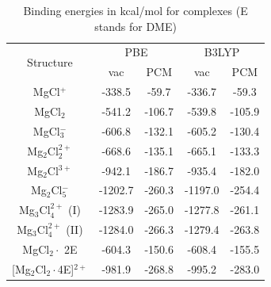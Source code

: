 \begin{table}
    \centering
    \caption[Binding energies in kcal/mol for complexes]{Binding energies in kcal/mol for complexes (E stands for DME)}
    \label{tab:mg-cl-dme-binding-energies}
\begin{tabular}{ccccc}
\toprule
\multicolumn{1}{c}{\multirow{2}{*}{Structure}} & \multicolumn{2}{c}{PBE}                                 & \multicolumn{2}{c}{B3LYP}                               \\
\multicolumn{1}{c}{}                           & \multicolumn{1}{c}{vac}    & \multicolumn{1}{c}{PCM}    & \multicolumn{1}{c}{vac}    & \multicolumn{1}{c}{PCM}    \\
\midrule
MgCl$^{+}$                                          & -338.5                     & -59.7                      & -336.7                     & -59.3                      \\
MgCl$_2$                                          & -541.2                     & -106.7                     & -539.8                     & -105.9                     \\
MgCl$_3^{-}$                                         & -606.8                     & -132.1                     & -605.2                     & -130.4                     \\
Mg$_2$Cl$_2^{2+}$                   & -668.6 & -135.1 & -665.1 & -133.3 \\
Mg$_2$Cl$^{3+}$                    & -942.1 & -186.7 & -935.4 & -182.0 \\
Mg$_2$Cl$_5^{-}$                                       & -1202.7                    & -260.3                     & -1197.0                    & -254.4                     \\
Mg$_3$Cl$_4^{2+}$ (I)                                   & -1283.9                    & -265.0                     & -1277.8                    & -261.1                     \\
Mg$_3$Cl$_4^{2+}$ (II)                                  & -1284.0                    & -266.3                     & -1279.4                    & -263.8                     \\
MgCl$_2 \cdot$ 2E                                       & -604.3                     & -150.6                     & -608.4                     & -155.5                     \\
{[}Mg$_2$Cl$_2 \cdot$4E{]}$^{2+}$                            & -981.9                     & -268.8                     & -995.2                     & -283.0                     \\

\end{tabular}
\end{table}
